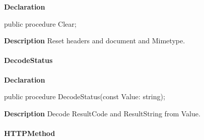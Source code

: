 \documentclass{report}
\newif\ifpdf
\begin{document}
\label{httpsend.THTTPSend-Clear}
\begin{list}{}{
\setlength{\itemindent}{0cm}
\setlength{\listparindent}{0cm}
\setlength{\leftmargin}{\evensidemargin}
\addtolength{\leftmargin}{\tmplength}
\settowidth{\labelsep}{X}
\addtolength{\leftmargin}{\labelsep}
\setlength{\labelwidth}{\tmplength}
}
\item[\textbf{Declaration}\hfill]
\ifpdf
\begin{flushleft}
\fi
\begin{ttfamily}
public procedure Clear;\end{ttfamily}

\ifpdf
\end{flushleft}
\fi

\par
\item[\textbf{Description}]
Reset headers and document and Mimetype.

\end{list}
\paragraph*{DecodeStatus}\hspace*{\fill}

\label{httpsend.THTTPSend-DecodeStatus}
\begin{list}{}{
\setlength{\itemindent}{0cm}
\setlength{\listparindent}{0cm}
\setlength{\leftmargin}{\evensidemargin}
\addtolength{\leftmargin}{\tmplength}
\settowidth{\labelsep}{X}
\addtolength{\leftmargin}{\labelsep}
\setlength{\labelwidth}{\tmplength}
}
\item[\textbf{Declaration}\hfill]
\ifpdf
\begin{flushleft}
\fi
\begin{ttfamily}
public procedure DecodeStatus(const Value: string);\end{ttfamily}

\ifpdf
\end{flushleft}
\fi

\par
\item[\textbf{Description}]
Decode ResultCode and ResultString from Value.

\end{list}
\paragraph*{HTTPMethod}\hspace*{\fill}
\end{document}
